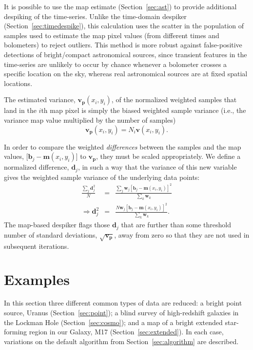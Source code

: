 \documentclass[useAMS,usenatbib,nofootinbib]{mn2e}
\begin{document}
It is possible to use the map estimate (Section~\ref{sec:ast}) to
provide additional despiking of the time-series. Unlike the
time-domain despiker (Section~\ref{sec:timedespike}), this calculation
uses the scatter in the population of samples used to estimate the map
pixel values (from different times and bolometers) to reject
outliers. This method is more robust against false-positive detections
of bright/compact astronomical sources, since transient features in the
time-series are unlikely to occur by chance whenever a bolometer
crosses a specific location on the sky, whereas real astronomical
sources are at fixed spatial locations.

The estimated variance, $\mathbf{v_p}(x_i,y_i)$, of the normalized
weighted samples that land in the $i$th map pixel is simply the biased
weighted sample variance (i.e., the variance map value multiplied by
the number of samples)
%
\begin{equation}
  \mathbf{v_p}(x_i,y_i) = N_i \mathbf{v}(x_i,y_i).
\end{equation}

In order to compare the weighted \emph{differences} between the
samples and the map values, [$\mathbf{b}_j - \mathbf{m}(x_i,y_i)$] to
$\mathbf{v_p}$, they must be scaled appropriately. We define a
normalized difference, $\mathbf{d}_j$, in such a way that the variance
of this new variable gives the weighted sample variance of the
underlying data points:
%
\begin{eqnarray}
  \frac{\sum_j \mathbf{d}_j^2}{N} &=&
  \frac{\sum_j \mathbf{w}_j [\mathbf{b}_j - \mathbf{m}(x_i,y_i)]^2}
       {\sum_k \mathbf{w}_k} \\
   \Rightarrow \mathbf{d}_j^2 &=& \frac{N \mathbf{w}_j [\mathbf{b}_j -
       \mathbf{m}(x_i,y_i)]^2}{ \sum_k \mathbf{w}_k} .
\end{eqnarray}
%
The map-based despiker flags those $\mathbf{d}_j$ that are further
than some threshold number of standard deviations,
$\sqrt{\mathbf{v_p}}$, away from zero so that they are not used in
subsequent iterations.


\section{Examples}
\label{sec:examples}

In this section three different common types of data are reduced: a
bright point source, Uranus (Section~\ref{sec:point}); a blind survey
of high-redshift galaxies in the Lockman Hole
(Section~\ref{sec:cosmo}); and a map of a bright extended star-forming
region in our Galaxy, M17 (Section~\ref{sec:extended}). In each case,
variations on the default algorithm from Section~\ref{sec:algorithm}
are described.
\end{document}
